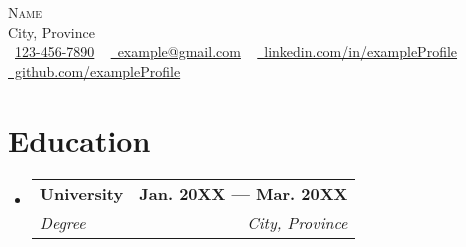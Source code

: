 \documentclass[letterpaper,11pt]{article}
\makeatletter
\newcommand{\resumeSubheading}[4]{
  \vspace{-2pt}\item
    \begin{tabular*}{1.0\textwidth}[t]{l@{\extracolsep{\fill}}r}
      \textbf{#1} & \textbf{\small #2} \\
      \textit{\small#3} & \textit{\small #4} \\
    \end{tabular*}\vspace{-7pt}
}
\newcommand{\resumeSubHeadingListStart}{\begin{itemize}[leftmargin=0.0in, label={}]}
\newcommand{\resumeSubHeadingListEnd}{\end{itemize}}
\makeatother
\begin{document}

\begin{center}
    {\Huge \scshape Name} \\ \vspace{1pt}
    City, Province \\ \vspace{1pt}
    \small \raisebox{-0.1\height}\faPhone\ \href{tel:+1234567890}{123-456-7890} ~ \href{mailto:example@gmail.com}{\raisebox{-0.2\height}\faEnvelope\  example@gmail.com} ~ 
    \href{https://linkedin.com/exampleProfile/}{\raisebox{-0.2\height}\faLinkedin\ linkedin.com/in/exampleProfile}  ~
    \href{https://github.com/exampleProfile}{\raisebox{-0.2\height}\faGithub\ github.com/exampleProfile}
\end{center}
\section{Education}
  \resumeSubHeadingListStart
    \resumeSubheading
      {University}{Jan. 20XX --- Mar. 20XX}
      {Degree}{City, Province}
  \resumeSubHeadingListEnd
\end{document}
